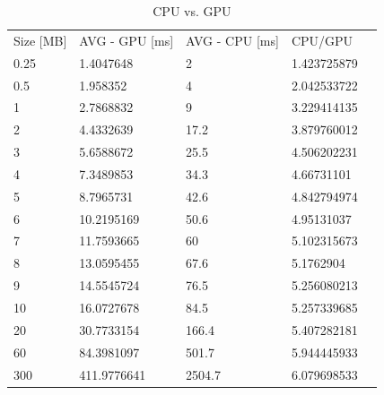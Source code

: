 \documentclass[conference]{IEEEtran}
\begin{document}
\begin{table}[h!]
\centering
\caption{CPU vs. GPU}
\label{my-label}
\begin{tabular}{lllll}
Size {[}MB{]} & AVG - GPU {[}ms{]} & AVG - CPU {[}ms{]} & CPU/GPU     &  \\
0.25          & 1.4047648          & 2                  & 1.423725879 &  \\
0.5           & 1.958352           & 4                  & 2.042533722 &  \\
1             & 2.7868832          & 9                  & 3.229414135 &  \\
2             & 4.4332639          & 17.2               & 3.879760012 &  \\
3             & 5.6588672          & 25.5               & 4.506202231 &  \\
4             & 7.3489853          & 34.3               & 4.66731101  &  \\
5             & 8.7965731          & 42.6               & 4.842794974 &  \\
6             & 10.2195169         & 50.6               & 4.95131037  &  \\
7             & 11.7593665         & 60                 & 5.102315673 &  \\
8             & 13.0595455         & 67.6               & 5.1762904   &  \\
9             & 14.5545724         & 76.5               & 5.256080213 &  \\
10            & 16.0727678         & 84.5               & 5.257339685 &  \\
20            & 30.7733154         & 166.4              & 5.407282181 &  \\
60            & 84.3981097         & 501.7              & 5.944445933 &  \\
300           & 411.9776641        & 2504.7             & 6.079698533 & 
\end{tabular}
\end{table}







\ifCLASSOPTIONcaptionsoff
  \newpage
\fi


\newpage
\end{document}
